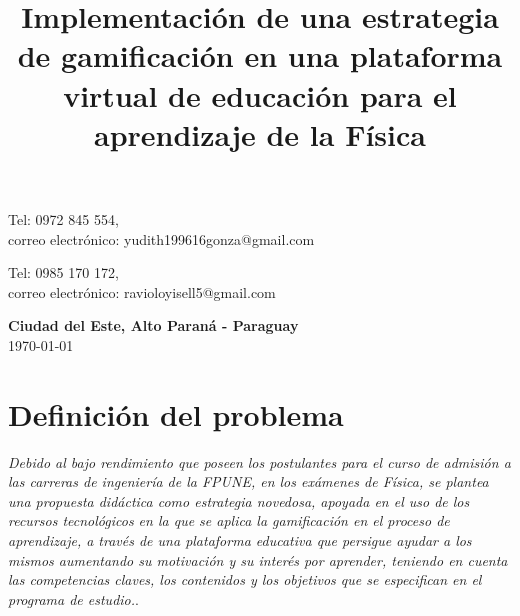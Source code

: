 \documentclass[12pt,a4paper]{article}
\begin{document}
\begin{titlepage}
\begin{minipage}{0.9\textwidth}
\begin{flushleft}
\begin{footnotesize}
\begin{scriptsize}\end{scriptsize}Tel: 0972 845 554,\\
correo electrónico: yudith199616gonza@gmail.com \\
\vspace*{.5cm}
\begin{scriptsize}\end{scriptsize}Tel: 0985 170 172,\\
 correo electrónico: ravioloyisell5@gmail.com  \\
\vspace*{.5cm}

 \end{footnotesize}
\end{flushleft}
\end{minipage}

\vspace{2.0cm}

\begin{center}
{\large {\bf Ciudad del Este, Alto Paraná - Paraguay}\\[6mm]
\today}\\
\end{center}


\end{titlepage}

\tableofcontents

\vspace{1cm}

\title{Implementación de una estrategia de gamificación en una plataforma virtual de educación para el aprendizaje de la Física}
\vspace{1cm}
\date{}
\maketitle

\thispagestyle{empty}
\section{Definición del problema}
 \textit{Debido al bajo rendimiento que poseen los postulantes para el curso de admisión a las carreras de ingeniería de la FPUNE, en los exámenes de Física, se plantea una propuesta didáctica como estrategia novedosa, apoyada en el uso de los recursos tecnológicos en la que se aplica la gamificación en el proceso de aprendizaje, a través de una plataforma educativa que persigue ayudar a los mismos aumentando su motivación y su interés por aprender, teniendo en cuenta las competencias claves, los contenidos y los objetivos que se especifican en el programa de estudio.}.
\end{document}
